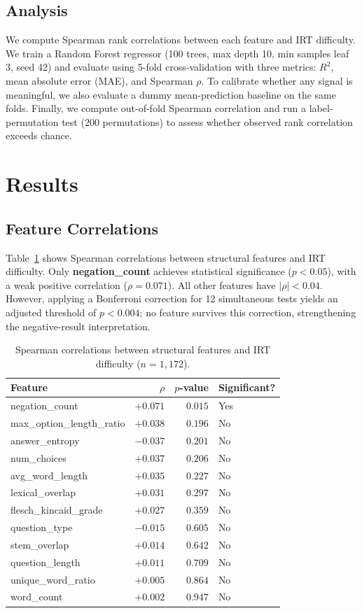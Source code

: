 \documentclass[11pt,a4paper]{article}
\begin{document}
\subsection{Analysis}

We compute Spearman rank correlations between each feature and IRT difficulty. We train a Random Forest regressor (100 trees, max depth 10, min samples leaf 3, seed 42) and evaluate using 5-fold cross-validation with three metrics: $R^2$, mean absolute error (MAE), and Spearman $\rho$. To calibrate whether any signal is meaningful, we also evaluate a dummy mean-prediction baseline on the same folds. Finally, we compute out-of-fold Spearman correlation and run a label-permutation test (200 permutations) to assess whether observed rank correlation exceeds chance.

\section{Results}

\subsection{Feature Correlations}

Table~\ref{tab:correlations} shows Spearman correlations between structural features and IRT difficulty. Only \textbf{negation\_count} achieves statistical significance ($p < 0.05$), with a weak positive correlation ($\rho = 0.071$). All other features have $|\rho| < 0.04$. However, applying a Bonferroni correction for 12 simultaneous tests yields an adjusted threshold of $p < 0.004$; no feature survives this correction, strengthening the negative-result interpretation.

\begin{table}[h]
\centering
\caption{Spearman correlations between structural features and IRT difficulty ($n = 1{,}172$).}
\label{tab:correlations}
\begin{tabular}{lrrl}
\toprule
Feature & $\rho$ & $p$-value & Significant? \\
\midrule
negation\_count & $+0.071$ & $0.015$ & Yes \\
max\_option\_length\_ratio & $+0.038$ & $0.196$ & No \\
answer\_entropy & $-0.037$ & $0.201$ & No \\
num\_choices & $+0.037$ & $0.206$ & No \\
avg\_word\_length & $+0.035$ & $0.227$ & No \\
lexical\_overlap & $+0.031$ & $0.297$ & No \\
flesch\_kincaid\_grade & $+0.027$ & $0.359$ & No \\
question\_type & $-0.015$ & $0.605$ & No \\
stem\_overlap & $+0.014$ & $0.642$ & No \\
question\_length & $+0.011$ & $0.709$ & No \\
unique\_word\_ratio & $+0.005$ & $0.864$ & No \\
word\_count & $+0.002$ & $0.947$ & No \\
\bottomrule
\end{tabular}
\end{table}
\end{document}
